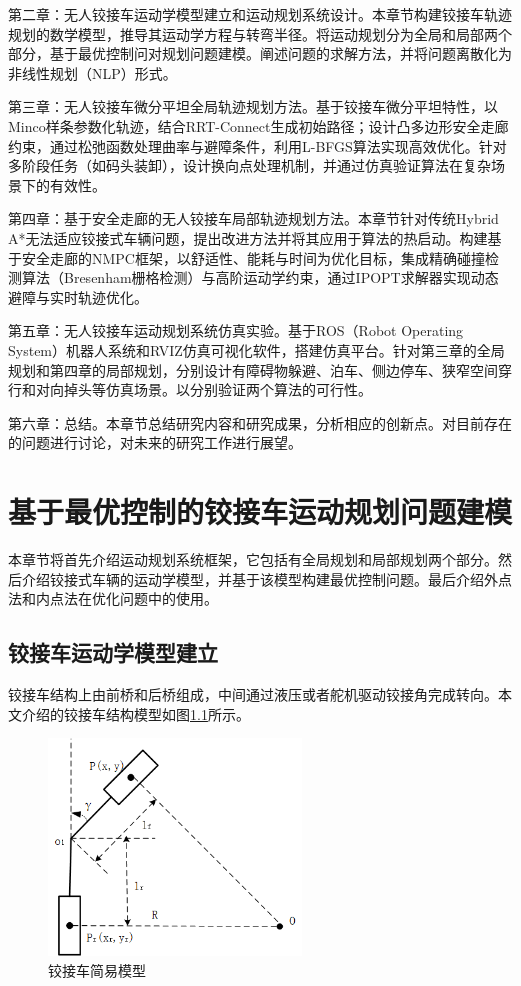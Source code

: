 \documentclass[master,academic]{ysuthesis} %
\begin{document}
	第二章：无人铰接车运动学模型建立和运动规划系统设计。本章节构建铰接车轨迹规划的数学模型，推导其运动学方程与转弯半径。将运动规划分为全局和局部两个部分，基于最优控制问对规划问题建模。阐述问题的求解方法，并将问题离散化为非线性规划（NLP）形式。

	第三章：无人铰接车微分平坦全局轨迹规划方法​。基于铰接车微分平坦特性，以Minco样条参数化轨迹，结合RRT-Connect生成初始路径；设计凸多边形安全走廊约束，通过松弛函数处理曲率与避障条件，利用L-BFGS算法实现高效优化。针对多阶段任务（如码头装卸），设计换向点处理机制，并通过仿真验证算法在复杂场景下的有效性。

	第四章：基于安全走廊的无人铰接车局部轨迹规划方法​。本章节针对传统Hybrid A*无法适应铰接式车辆问题，提出改进方法并将其应用于算法的热启动。构建基于安全走廊的NMPC框架，以舒适性、能耗与时间为优化目标，集成精确碰撞检测算法（Bresenham栅格检测）与高阶运动学约束，通过IPOPT求解器实现动态避障与实时轨迹优化。

	第五章：无人铰接车运动规划系统仿真实验​。基于ROS（Robot Operating System）机器人系统和RVIZ仿真可视化软件，搭建仿真平台。针对第三章的全局规划和第四章的局部规划，分别设计有障碍物躲避、泊车、侧边停车、狭窄空间穿行和对向掉头等仿真场景。以分别验证两个算法的可行性。

	第六章：总结​。本章节总结研究内容和研究成果，分析相应的创新点。对目前存在的问题进行讨论，对未来的研究工作进行展望。

	\chapter{基于最优控制的铰接车运动规划问题建模}
	本章节将首先介绍运动规划系统框架，它包括有全局规划和局部规划两个部分。然后介绍铰接式车辆的运动学模型，并基于该模型构建最优控制问题。最后介绍外点法和内点法在优化问题中的使用。

	\section{铰接车运动学模型建立}
	铰接车结构上由前桥和后桥组成，中间通过液压或者舵机驱动铰接角完成转向。本文介绍的铰接车结构模型如图\ref{fig:铰接车简易模型}所示。 
	\begin{figure}[!ht]
		\centering
		\includegraphics[width=0.6\textwidth]{铰接车简易模型.png}
		\caption{铰接车简易模型}
		\label{fig:铰接车简易模型}
	\end{figure}
\end{document}
